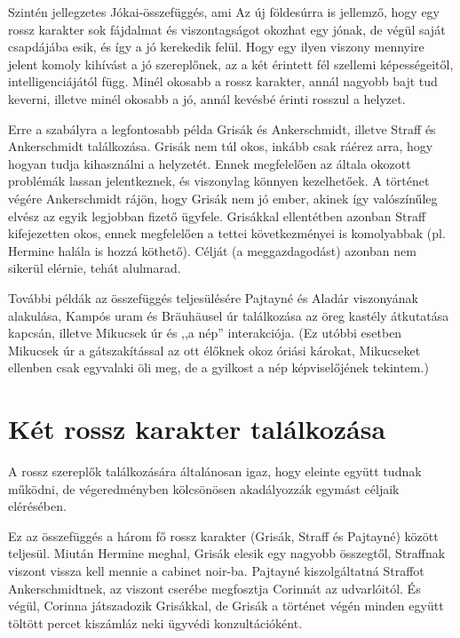 \documentclass[a4paper,12pt]{thesis-ekf}
\begin{document}
    Szintén jellegzetes Jókai-összefüggés, ami Az új földesúrra is jellemző, hogy egy rossz karakter
        sok fájdalmat és viszontagságot okozhat egy jónak, de végül saját csapdájába esik, és így a jó kerekedik felül.
    Hogy egy ilyen viszony mennyire jelent komoly kihívást a jó szereplőnek, az a két érintett fél szellemi képességeitől,
        intelligenciájától függ.
    Minél okosabb a rossz karakter, annál nagyobb bajt tud keverni, illetve minél okosabb a jó,
        annál kevésbé érinti rosszul a helyzet.

    Erre a szabályra a legfontosabb példa Grisák és Ankerschmidt, illetve Straff és Ankerschmidt találkozása.
        Grisák nem túl okos, inkább csak ráérez arra, hogy hogyan tudja kihasználni a helyzetét.
    Ennek megfelelően az általa okozott problémák lassan jelentkeznek, és viszonylag könnyen kezelhetőek.
    A történet végére Ankerschmidt rájön, hogy Grisák nem jó ember, akinek így valószínűleg elvész az egyik
        legjobban fizető ügyfele.
    Grisákkal ellentétben azonban Straff kifejezetten okos, ennek megfelelően a tettei következményei is komolyabbak
        (pl. Hermine halála is hozzá köthető).
    Célját (a meggazdagodást) azonban nem sikerül elérnie, tehát alulmarad.

    További példák az összefüggés teljesülésére Pajtayné és Aladár viszonyának alakulása, Kampós uram és
        Bräuhäusel úr találkozása az öreg kastély átkutatása kapcsán, illetve Mikucsek úr és ,,a nép'' interakciója.
    (Ez utóbbi esetben Mikucsek úr a gátszakítással az ott élőknek okoz óriási károkat, Mikucseket ellenben csak
        egyvalaki öli meg, de a gyilkost a nép képviselőjének tekintem.)

    \section{Két rossz karakter találkozása}

    A rossz szereplők találkozására általánosan igaz, hogy eleinte együtt tudnak működni,
        de végeredményben kölcsönösen akadályozzák egymást céljaik elérésében.

    Ez az összefüggés a három fő rossz karakter (Grisák, Straff és Pajtayné) között teljesül.
    Miután Hermine meghal, Grisák elesik egy nagyobb összegtől, Straffnak viszont vissza kell mennie a cabinet noir-ba.
    Pajtayné kiszolgáltatná Straffot Ankerschmidtnek, az viszont cserébe megfosztja Corinnát az udvarlóitól.
    És végül, Corinna játszadozik Grisákkal, de Grisák a történet végén minden együtt töltött percet
        kiszámláz neki ügyvédi konzultációként.
\end{document}
